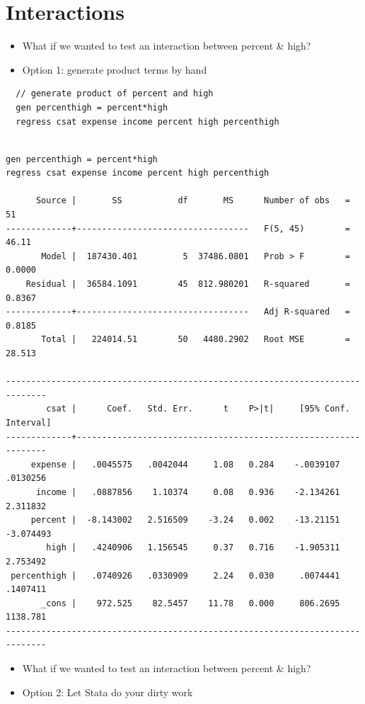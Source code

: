\documentclass[]{book}
\providecommand{\tightlist}{%
  \setlength{\itemsep}{0pt}\setlength{\parskip}{0pt}}
\begin{document}
\section{Interactions}\label{interactions}

\begin{itemize}
\tightlist
\item
  What if we wanted to test an interaction between percent \& high?
\item
  Option 1: generate product terms by hand
\end{itemize}

\begin{verbatim}
  // generate product of percent and high
  gen percenthigh = percent*high 
  regress csat expense income percent high percenthigh
\end{verbatim}

\begin{verbatim}

gen percenthigh = percent*high
regress csat expense income percent high percenthigh

      Source |       SS           df       MS      Number of obs   =        51
-------------+----------------------------------   F(5, 45)        =     46.11
       Model |  187430.401         5  37486.0801   Prob > F        =    0.0000
    Residual |  36584.1091        45  812.980201   R-squared       =    0.8367
-------------+----------------------------------   Adj R-squared   =    0.8185
       Total |   224014.51        50   4480.2902   Root MSE        =    28.513

------------------------------------------------------------------------------
        csat |      Coef.   Std. Err.      t    P>|t|     [95% Conf. Interval]
-------------+----------------------------------------------------------------
     expense |   .0045575   .0042044     1.08   0.284    -.0039107    .0130256
      income |   .0887856    1.10374     0.08   0.936    -2.134261    2.311832
     percent |  -8.143002   2.516509    -3.24   0.002    -13.21151   -3.074493
        high |   .4240906   1.156545     0.37   0.716    -1.905311    2.753492
 percenthigh |   .0740926   .0330909     2.24   0.030     .0074441    .1407411
       _cons |    972.525    82.5457    11.78   0.000     806.2695    1138.781
------------------------------------------------------------------------------
\end{verbatim}

\begin{itemize}
\tightlist
\item
  What if we wanted to test an interaction between percent \& high?
\item
  Option 2: Let Stata do your dirty work
\end{itemize}
\end{document}

